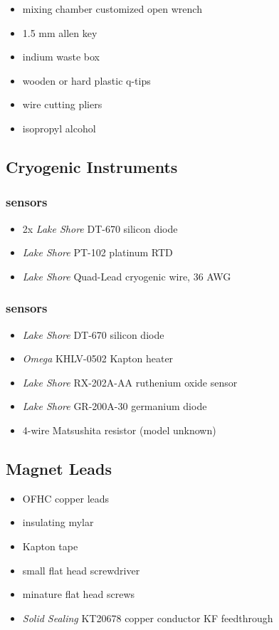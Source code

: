 \begin{itemize}
  \item mixing chamber customized open wrench
  \item 1.5 mm allen key
  \item indium waste box
  \item wooden or hard plastic q-tips
  \item wire cutting pliers
  \item isopropyl alcohol 
\end{itemize}


  \subsection{Cryogenic Instruments}

\subsubsection{\hef{} sensors}
  \begin{itemize}
   \item 2x \textit{Lake Shore\circledR} DT-670 silicon diode
\item \textit{Lake Shore\circledR} PT-102 platinum RTD
\item \textit{Lake Shore\circledR} Quad-Lead cryogenic wire, 36 AWG
  \end{itemize}
\subsubsection{\het{} sensors}
\begin{itemize}
 \item \textit{Lake Shore\circledR} DT-670 silicon diode
 \item \textit{Omega\circledR} KHLV-0502 Kapton heater
 \item \textit{Lake Shore\circledR} RX-202A-AA ruthenium oxide sensor
 \item \textit{Lake Shore\circledR} GR-200A-30 germanium diode
 \item 4-wire Matsushita resistor (model unknown) 

\end{itemize}

  \subsection{Magnet Leads}
\begin{itemize}
 \item OFHC copper leads
\item insulating mylar
\item Kapton tape
\item small flat head screwdriver
\item minature flat head screws
\item \textit{Solid Sealing\circledR} KT20678 copper conductor KF feedthrough
\end{itemize}


